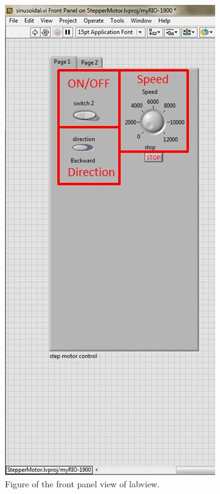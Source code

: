 \documentclass[idxtotoc,hyperref,openany]{labbook} %
\begin{document}
\begin{figure}[h!]
\centering
\includegraphics[scale=0.5]{./Figure/fig_labviewfront}
\caption{Figure of the front panel view of labview.}\label{fig_labviewfront}
\end{figure}
\end{document}
